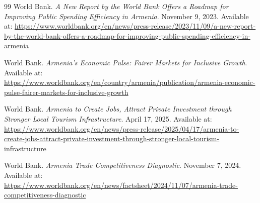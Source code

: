 \documentclass[12pt,a4paper]{report}
\begin{document}
\begin{thebibliography}{99}
World Bank.
\textit{A New Report by the World Bank Offers a Roadmap for Improving Public Spending Efficiency in Armenia}.
November 9, 2023.
Available at: \url{https://www.worldbank.org/en/news/press-release/2023/11/09/a-new-report-by-the-world-bank-offers-a-roadmap-for-improving-public-spending-efficiency-in-armenia}

World Bank.
\textit{Armenia's Economic Pulse: Fairer Markets for Inclusive Growth}.
Available at: \url{https://www.worldbank.org/en/country/armenia/publication/armenia-economic-pulse-fairer-markets-for-inclusive-growth}

World Bank.
\textit{Armenia to Create Jobs, Attract Private Investment through Stronger Local Tourism Infrastructure}.
April 17, 2025.
Available at: \url{https://www.worldbank.org/en/news/press-release/2025/04/17/armenia-to-create-jobs-attract-private-investment-through-stronger-local-tourism-infrastructure}

World Bank.
\textit{Armenia Trade Competitiveness Diagnostic}.
November 7, 2024.
Available at: \url{https://www.worldbank.org/en/news/factsheet/2024/11/07/armenia-trade-competitiveness-diagnostic}
\end{thebibliography}
\end{document}
